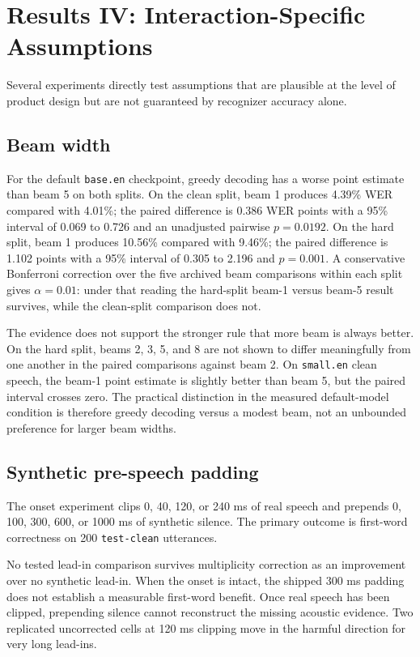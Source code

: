 \section{Results IV: Interaction-Specific Assumptions}

Several experiments directly test assumptions that are plausible at the level of product design
but are not guaranteed by recognizer accuracy alone.

\subsection{Beam width}

For the default \texttt{base.en} checkpoint, greedy decoding has a worse point estimate than
beam 5 on both splits. On the clean split, beam 1 produces 4.39\% WER compared with 4.01\%;
the paired difference is 0.386 WER points with a 95\% interval of 0.069 to 0.726 and an
unadjusted pairwise $p=0.0192$. On the hard split, beam 1 produces 10.56\% compared with
9.46\%; the paired difference is 1.102 points with a 95\% interval of 0.305 to 2.196 and
$p=0.001$. A conservative Bonferroni correction over the five archived beam comparisons within
each split gives $\alpha=0.01$: under that reading the hard-split beam-1 versus beam-5 result
survives, while the clean-split comparison does not.

The evidence does not support the stronger rule that more beam is always better. On the hard
split, beams 2, 3, 5, and 8 are not shown to differ meaningfully from one another in the paired
comparisons against beam 2. On \texttt{small.en} clean speech, the beam-1 point estimate is
slightly better than beam 5, but the paired interval crosses zero. The practical distinction in
the measured default-model condition is therefore greedy decoding versus a modest beam, not an
unbounded preference for larger beam widths.

\subsection{Synthetic pre-speech padding}

The onset experiment clips 0, 40, 120, or 240 ms of real speech and prepends 0, 100, 300, 600,
or 1000 ms of synthetic silence. The primary outcome is first-word correctness on 200
\texttt{test-clean} utterances.

No tested lead-in comparison survives multiplicity correction as an improvement over no
synthetic lead-in. When the onset is intact, the shipped 300 ms padding does not establish a
measurable first-word benefit. Once real speech has been clipped, prepending silence cannot
reconstruct the missing acoustic evidence. Two replicated uncorrected cells at 120 ms clipping
move in the harmful direction for very long lead-ins.

